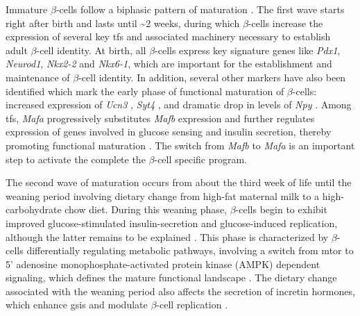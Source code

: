 \par Immature $\beta$-cells follow a biphasic pattern of maturation \textbf{\cite{salinno_-cell_2019, stolovich-rain_weaning_2015}}. The first wave starts right after birth and lasts until \textasciitilde 2 weeks, during which $\beta$-cells increase the expression of several key \glspl{tf} and associated machinery necessary to establish adult $\beta$-cell identity. At birth, all $\beta$-cells express key signature genes like \textit{Pdx1}, \textit{Neurod1}, \textit{Nkx2-2} and \textit{Nkx6-1}, which are important for the establishment and maintenance of $\beta$-cell identity. In addition, several other markers have also been identified which mark the early phase of functional maturation of $\beta$-cells: increased expression of \textit{Ucn3} \textbf{\cite{salinno_-cell_2019, blum_functional_2012}}, \textit{Syt4} \textbf{\cite{salinno_-cell_2019, huang_synaptotagmin_2018}},  \textbf{\cite{salinno_-cell_2019, bader_identification_2016}}  and dramatic drop in levels of \textit{Npy} \textbf{\cite{salinno_-cell_2019, rodnoi_neuropeptide_2017}}. Among \glspl{tf}, \textit{Mafa} progressively substitutes \textit{Mafb} expression and further regulates expression of genes involved in glucose sensing and insulin secretion, thereby promoting functional maturation \textbf{\cite{salinno_-cell_2019}}. The switch from \textit{Mafb} to \textit{Mafa} is an important step to activate the complete the $\beta$-cell specific program.\\

\par The second wave of maturation occurs from about the third week of life until the weaning period involving dietary change from high-fat maternal milk to a high-carbohydrate chow diet. During this weaning phase, $\beta$-cells begin to exhibit improved glucose-stimulated insulin-secretion and glucose-induced replication, although the latter remains to be explained \textbf{\cite{salinno_-cell_2019,stolovich-rain_weaning_2015}}. This phase is characterized by $\beta$-cells differentially regulating metabolic pathways, involving a switch from \gls{mtor} to 5' adenosine monophosphate-activated protein kinase (AMPK) dependent signaling, which defines the mature functional landscape \textbf{\cite{salinno_-cell_2019,jaafar_mtorc1_2019}}. The dietary change associated with the weaning period also affects the secretion of incretin hormones, which enhance \gls{gsis} and modulate $\beta$-cell replication \textbf{\cite{campbell_pharmacology_2013}}.


